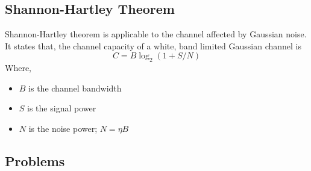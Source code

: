 \documentclass[12pt]{article}
\begin{document}
\subsection{Shannon-Hartley Theorem}
Shannon-Hartley theorem is applicable to the channel affected by Gaussian noise. It states that, the channel capacity of a white, band limited Gaussian channel is
$$ C = B \log_2(1 + S/N) $$
Where,
\begin{itemize}
    \item $B$ is the channel bandwidth
    \item $S$ is the signal power
    \item $N$ is the noise power; $N = \eta B$
\end{itemize}

\subsection*{Problems}
\end{document}
